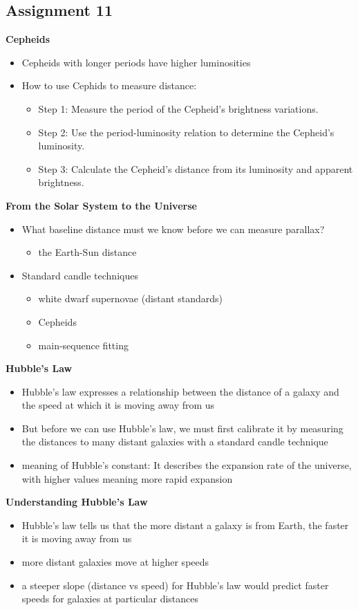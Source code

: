 \subsection{Assignment 11}
\textbf{Cepheids}
\begin{itemize}
\item Cepheids with longer periods have higher luminosities
\item How to use Cephids to measure distance:
\begin{itemize}
\item Step 1: Measure the period of the Cepheid's brightness variations.
\item Step 2: Use the period-luminosity relation to determine the Cepheid's luminosity.
\item Step 3: Calculate the Cepheid's distance from its luminosity and apparent brightness.
\end{itemize}
\end{itemize}
\textbf{From the Solar System to the Universe}
\begin{itemize}
\item What baseline distance must we know before we can measure parallax?
\begin{itemize}
\item the Earth-Sun distance
\end{itemize}
\item Standard candle techniques
\begin{itemize}
\item white dwarf supernovae (distant standards)
\item Cepheids
\item main-sequence fitting
\end{itemize}
\end{itemize}
\textbf{Hubble's Law}
\begin{itemize}
\item Hubble's law expresses a relationship between the distance of a galaxy and the speed at which it is moving away from us
\item But before we can use Hubble's law, we must first calibrate it by measuring the distances to many distant galaxies with a standard candle technique
\item meaning of Hubble's constant: It describes the expansion rate of the universe, with higher values meaning more rapid expansion
\end{itemize}
\textbf{Understanding Hubble’s Law}
\begin{itemize}
\item Hubble’s law tells us that the more distant a galaxy is from Earth, the faster it is moving away from us
\item more distant galaxies move at higher speeds
\item a steeper slope (distance vs speed) for Hubble’s law would predict faster speeds for galaxies at particular distances
\end{itemize}
